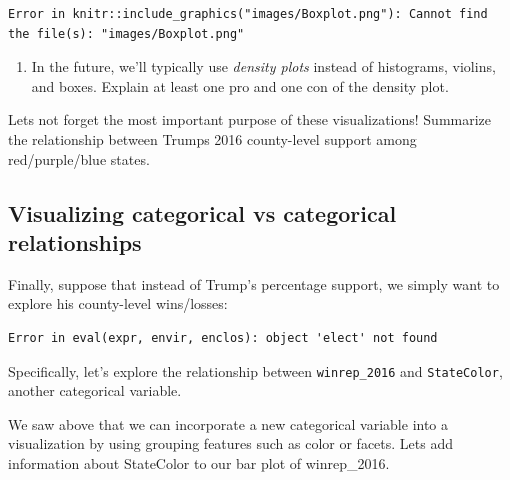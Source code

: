 \documentclass[
  letterpaper,
  DIV=11,
  numbers=noendperiod]{scrreprt}
\newenvironment{Shaded}{\begin{snugshade}}{\end{snugshade}}
\newcommand{\NormalTok}[1]{\textcolor[rgb]{0.00,0.23,0.31}{#1}}
\providecommand{\tightlist}{%
  \setlength{\itemsep}{0pt}\setlength{\parskip}{0pt}}\usepackage{longtable,booktabs,array}
\begin{document}
\begin{verbatim}
Error in knitr::include_graphics("images/Boxplot.png"): Cannot find the file(s): "images/Boxplot.png"
\end{verbatim}

\begin{enumerate}
\def\labelenumi{\alph{enumi}.}
\setcounter{enumi}{1}
\tightlist
\item
  In the future, we'll typically use \emph{density plots} instead of
  histograms, violins, and boxes. Explain at least one pro and one con
  of the density plot.
\end{enumerate}

\begin{Shaded}
\begin{Highlighting}[]
\NormalTok{Let\textquotesingle{}s not forget the most important purpose of these visualizations!  Summarize the relationship between Trump\textquotesingle{}s 2016 county{-}level support among red/purple/blue states.  }
\end{Highlighting}
\end{Shaded}

\subsection*{Visualizing categorical vs categorical
relationships}\label{visualizing-categorical-vs-categorical-relationships}

Finally, suppose that instead of Trump's percentage support, we simply
want to explore his county-level wins/losses:

\begin{verbatim}
Error in eval(expr, envir, enclos): object 'elect' not found
\end{verbatim}

Specifically, let's explore the relationship between
\texttt{winrep\_2016} and \texttt{StateColor}, another categorical
variable.

\begin{Shaded}
\begin{Highlighting}[]
\NormalTok{We saw above that we can incorporate a new categorical variable into a visualization by using grouping features such as color or facets.  Let\textquotesingle{}s add information about \textasciigrave{}StateColor\textasciigrave{} to our bar plot of \textasciigrave{}winrep\_2016\textasciigrave{}.    }
\end{Highlighting}
\end{Shaded}
\end{document}
